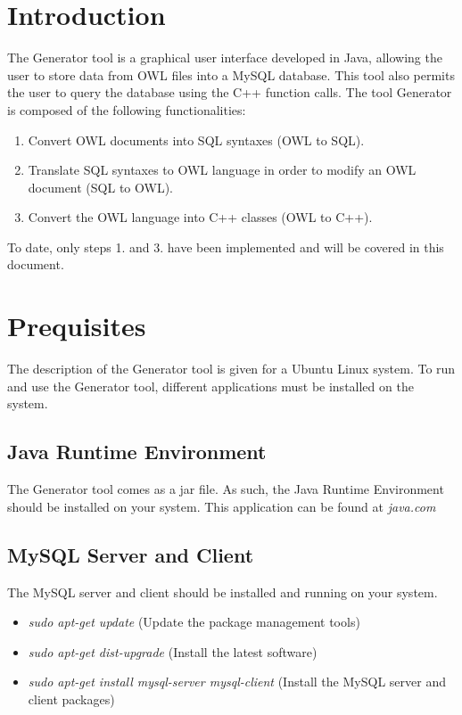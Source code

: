 \documentclass[12pt]{article}
\begin{document}
\maketitle
\tableofcontents
\clearpage

\section{Introduction}\label{s:introduction}

The Generator tool is a graphical user interface developed in Java, allowing the user to store data from OWL files into a MySQL database. This tool also permits the user to query the database using the C++ function calls. The tool Generator is composed of the following functionalities:
\begin{enumerate}
 \item Convert OWL documents into SQL syntaxes (OWL to SQL).
 \item Translate SQL syntaxes to OWL language in order to modify an OWL document (SQL to OWL).
 \item Convert the OWL language into C++ classes (OWL to C++).
\end{enumerate}

To date, only steps 1. and 3. have been implemented and will be covered in this document.

\section{Prequisites}\label{s:prequisites}
The description of the Generator tool is given for a Ubuntu Linux system. To run and use the Generator tool, different applications must be installed on the system.

\subsection{Java Runtime Environment}
The Generator tool comes as a jar file. As such, the Java Runtime Environment should be installed on your system. This application can be found at \textit{java.com}

\subsection{MySQL Server and Client}
The MySQL server and client should be installed and running on your system.
\begin{itemize}
 \item \textit{sudo apt-get update} (Update the package management tools)
 \item \textit{sudo apt-get dist-upgrade} (Install the latest software)
 \item \textit{sudo apt-get install mysql-server mysql-client} (Install the MySQL server and client packages)
\end{itemize}
\end{document}
